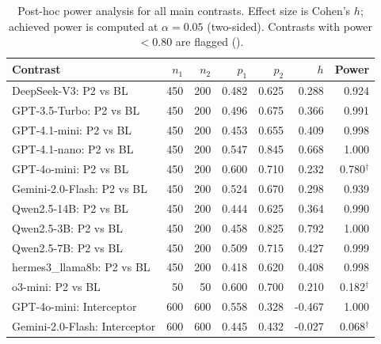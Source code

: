 \begin{table}[t]
\centering
\caption{Post-hoc power analysis for all main contrasts. Effect size is Cohen's $h$; achieved power is computed at $\alpha = 0.05$ (two-sided). Contrasts with power $< 0.80$ are flagged (\dag).}
\label{tab:power}
\small
\begin{tabular}{l r r r r r r}
\toprule
Contrast & $n_1$ & $n_2$ & $p_1$ & $p_2$ & $h$ & Power \\
\midrule
DeepSeek-V3: P2 vs BL & 450 & 200 & 0.482 & 0.625 & 0.288 & 0.924 \\
GPT-3.5-Turbo: P2 vs BL & 450 & 200 & 0.496 & 0.675 & 0.366 & 0.991 \\
GPT-4.1-mini: P2 vs BL & 450 & 200 & 0.453 & 0.655 & 0.409 & 0.998 \\
GPT-4.1-nano: P2 vs BL & 450 & 200 & 0.547 & 0.845 & 0.668 & 1.000 \\
GPT-4o-mini: P2 vs BL & 450 & 200 & 0.600 & 0.710 & 0.232 & 0.780$^{\dag}$ \\
Gemini-2.0-Flash: P2 vs BL & 450 & 200 & 0.524 & 0.670 & 0.298 & 0.939 \\
Qwen2.5-14B: P2 vs BL & 450 & 200 & 0.444 & 0.625 & 0.364 & 0.990 \\
Qwen2.5-3B: P2 vs BL & 450 & 200 & 0.458 & 0.825 & 0.792 & 1.000 \\
Qwen2.5-7B: P2 vs BL & 450 & 200 & 0.509 & 0.715 & 0.427 & 0.999 \\
hermes3_llama8b: P2 vs BL & 450 & 200 & 0.418 & 0.620 & 0.408 & 0.998 \\
o3-mini: P2 vs BL & 50 & 50 & 0.600 & 0.700 & 0.210 & 0.182$^{\dag}$ \\
GPT-4o-mini: Interceptor & 600 & 600 & 0.558 & 0.328 & -0.467 & 1.000 \\
Gemini-2.0-Flash: Interceptor & 600 & 600 & 0.445 & 0.432 & -0.027 & 0.068$^{\dag}$ \\
\bottomrule
\end{tabular}
\end{table}